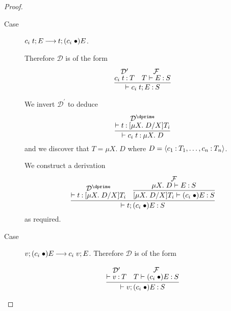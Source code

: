 \documentclass[11pt]{article}
\begin{document}
\begin{enumerate}
\begin{proof}
\begin{description}
        \item[Case]
          $c_i\; t; E \mathbin{\longrightarrow} t; (c_i\;\bullet) E$.

          Therefore $\mathcal{D}$ is of the form
          \begin{equation*}
            \infer{%
              \proves c_i\; t ; E \hastype S
            }{%
              \deduce[\mathcal{D}^\prime]{c_i\; t \hastype T}{}
              &
              \deduce[\mathcal{F}]{T \proves E \hastype S}{}
            }
          \end{equation*}

          We invert $\mathcal{D}^\prime$ to deduce
          \begin{equation*}
            \infer{%
              \proves c_i \; t \hastype \mu X.\; D
            }{%
              \deduce[\mathcal{D}^\dprime]{%
                \proves t \hastype [\mu X.\; D/X]T_i
              }{}
            }
          \end{equation*}
          and we discover that $T = \mu X.\; D$
          where
          $D = \langle c_1 \mathbin{:} T_1, \ldots, c_n \mathbin{:} T_n \rangle$.

          We construct a derivation
          \begin{equation*}
            \infer{%
              \proves t ; (c_i\;\bullet) E \hastype S
            }{%
              \deduce[\mathcal{D}^\dprime]{%
                \proves t \hastype [\mu X.\; D / X]T_i%
              }{}
              &
              \infer{%
                [\mu X.\; D/X]T_i \proves (c_i\;\bullet)E\hastype S
              }{
                \deduce[\mathcal{F}]{\mu X.\; D \proves E \hastype S}{}
              }
            }
          \end{equation*}
          as required.

        \item[Case]
          $v;(c_i\;\bullet)E \mathbin{\longrightarrow} c_i\; v ; E$.
          Therefore $\mathcal{D}$ is of the form

          \begin{equation*}
            \infer{
              \proves v; (c_i\;\bullet) E \hastype S
            }{
              \deduce[\mathcal{D}^\prime]{
                \proves v \hastype T
              }{}
              &
              \deduce[\mathcal{F}]{
                T \proves (c_i\;\bullet) E \hastype S
              }{}
            }
          \end{equation*}


\end{description}
\end{proof}
\end{enumerate}
\end{document}
